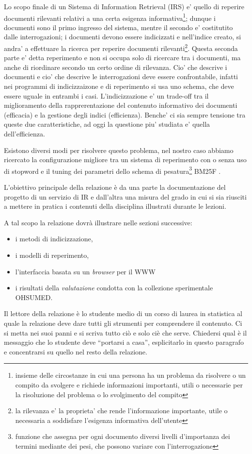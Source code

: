\documentclass[runningheads]{llncs}
\begin{document}
Lo scopo finale di un Sistema di Information Retrieval (IRS) e' quello di reperire documenti rilevanti relativi a una certa esigenza informativa\footnote{insieme delle circostanze in cui una persona ha un problema da risolvere o un compito da svolgere e richiede informazioni importanti, utili o necessarie per la risoluzione del problema o lo svolgimento del compito}; dunque i documenti sono il primo ingresso del sistema, mentre il secondo e' costitutito dalle interrogazioni; i documenti devono essere indicizzati e nell'indice creato, si andra' a effettuare la ricerca per reperire documenti rilevanti\footnote{la rilevanza e' la proprieta' che rende l'informazione importante, utile o necessaria a soddisfare l'esigenza informativa dell'utente}. Questa seconda parte e' detta reperimento e non si occupa solo di ricercare tra i documenti, ma anche di riordinare secondo un certo ordine di rilevanza. Cio' che descrive i documenti e cio' che descrive le interrogazioni deve essere confrontabile, infatti nei programmi di indicizzaizone e di reperimento si usa uno schema, che deve essere uguale in entrambi i casi.
L'indicizzazione e' un trade-off tra il  miglioramento della rapprerentazione del contenuto informativo dei documenti (efficacia) e la gestione degli indici (efficienza). Benche' ci sia sempre tensione tra queste due caratteristiche, ad oggi la questione piu' studiata e' quella dell'efficienza.

Esistono diversi modi per risolvere questo problema, nel nostro caso abbiamo ricercato la configurazione migliore tra un sistema di
reperimento con o senza uso di stopword e il tuning dei parametri dello schema di pesatura\footnote{funzione che assegna per ogni documento diversi livelli d’importanza dei termini mediante dei pesi, che possono variare con l’interrogazione} BM25F \cite{WBC}.




L'obiettivo principale della relazione \`e da una parte la
documentazione del progetto di un servizio di {IR} e dall'altra una
misura del grado in cui si sia riusciti a mettere in pratica i
contenuti della disciplina illustrati durante le lezioni.

A tal scopo la relazione dovr\`a illustrare nelle sezioni successive:
\begin{itemize}
\item i metodi di indicizzazione,
\item i modelli di reperimento,
\item l'interfaccia basata su un \textit{browser} per il {WWW}
\item i risultati della \emph{valutazione} condotta con la collezione
  sperimentale OHSUMED.
\end{itemize}
Il lettore della relazione \`e lo studente medio di un corso di laurea
in statistica al quale la relazione deve dare tutti gli strumenti per
comprendere il contenuto.  Ci si metta nei suoi panni e si scriva
tutto ci\`o e solo ci\`e che serve.  Chiedersi qual \`e il messaggio
che lo studente deve ``portarsi a casa'', esplicitarlo in questo
paragrafo e concentrarsi su quello nel resto della relazione.
\end{document}
